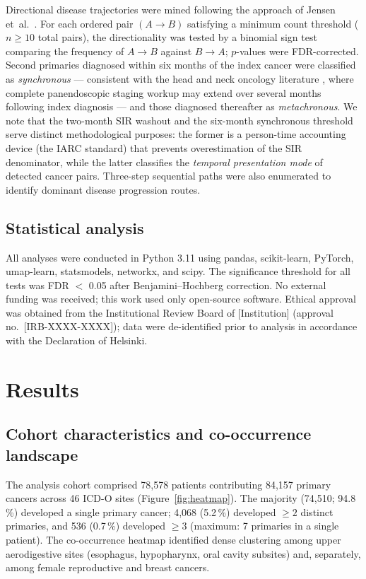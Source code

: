 \documentclass[review,12pt]{elsarticle}
\begin{document}
Directional disease trajectories were mined following the approach of Jensen
et~al.\ \cite{Jensen2014}. For each ordered pair $(A \rightarrow B)$ satisfying
a minimum count threshold ($n \geq 10$ total pairs), the directionality was
tested by a binomial sign test comparing the frequency of $A \rightarrow B$
against $B \rightarrow A$; $p$-values were FDR-corrected. Second primaries
diagnosed within six months of the index cancer were classified as
\textit{synchronous} --- consistent with the head and neck oncology literature
\cite{Morris2011, Chuang2008}, where complete panendoscopic staging workup
may extend over several months following index diagnosis --- and those
diagnosed thereafter as \textit{metachronous}. We note that the two-month
SIR washout and the six-month synchronous threshold serve distinct
methodological purposes: the former is a person-time accounting device
(the IARC standard) that prevents overestimation of the SIR denominator,
while the latter classifies the \textit{temporal presentation mode} of
detected cancer pairs. Three-step sequential paths were also enumerated to
identify dominant disease progression routes.

\subsection{Statistical analysis}
All analyses were conducted in Python 3.11 using pandas, scikit-learn,
PyTorch, umap-learn, statsmodels, networkx, and scipy. The significance
threshold for all tests was FDR $<$ 0.05 after Benjamini--Hochberg correction.
No external funding was received; this work used only open-source software.
Ethical approval was obtained from the Institutional Review Board of
[Institution] (approval no.\ [IRB-XXXX-XXXX]); data were de-identified prior
to analysis in accordance with the Declaration of Helsinki.

\section{Results}

\subsection{Cohort characteristics and co-occurrence landscape}
The analysis cohort comprised 78,578 patients contributing 84,157 primary
cancers across 46 ICD-O sites (Figure~\ref{fig:heatmap}). The majority
(74,510; 94.8\,\%) developed a single primary cancer; 4,068 (5.2\,\%) developed
$\geq 2$ distinct primaries, and 536 (0.7\,\%) developed $\geq 3$ (maximum: 7
primaries in a single patient). The co-occurrence heatmap identified dense
clustering among upper aerodigestive sites (esophagus, hypopharynx, oral cavity
subsites) and, separately, among female reproductive and breast cancers.
\end{document}
